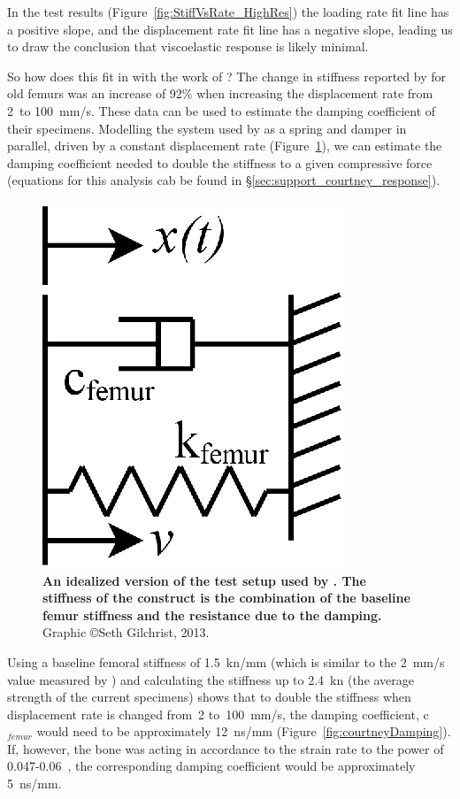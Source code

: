 In the test results (Figure~\ref{fig:StiffVsRate_HighRes}) the loading rate fit line has a positive slope, and the displacement rate fit line has a negative slope, leading us to draw the conclusion that viscoelastic response is likely minimal.

So how does this fit in with the work of \citet{courtney_effects_1994}?
The change in stiffness reported by \citet{courtney_effects_1994} for old femurs was an increase of 92\% when increasing the displacement rate from 2~to 100~\ac{mm}/\ac{s}.
These data can be used to estimate the damping coefficient of their specimens.
Modelling the system used by \citet{courtney_effects_1994} as a spring and damper in parallel, driven by a constant displacement rate (Figure~\ref{fig:courtneyModel}), we can estimate the damping coefficient needed to double the stiffness to a given compressive force (equations for this analysis cab be found in \S\ref{sec:support_courtney_response}).

\begin{figure}
\centering
\includegraphics[width=0.3\linewidth]{./behave_fail/Figures/courtneyModel}
\caption[Idealized \citet{courtney_effects_1994} model]{\textbf{An idealized version of the test setup used by \citet{courtney_effects_1994}. The stiffness of the construct is the combination of the baseline femur stiffness and the resistance due to the damping.} Graphic \copyright Seth Gilchrist, 2013.}
\label{fig:courtneyModel}
\end{figure}

Using a baseline femoral stiffness of 1.5~\ac{kn}/\ac{mm} (which is similar to the 2~\ac{mm}/\ac{s} value measured by \citet{courtney_effects_1994}) and calculating the stiffness up to 2.4~\ac{kn} (the average strength of the current specimens) shows that to double the stiffness when displacement rate is changed from~2 to~100~\ac{mm}/\ac{s}, the damping coefficient, c$_{femur}$ would need to be approximately 12~\ac{n}\ac{s}/\ac{mm} (Figure~\ref{fig:courtneyDamping}).
If, however, the bone was acting in accordance to the strain rate to the power of 0.047-0.06~\citep{carter_compressive_1977, linde_mechanical_1991, crowninshield_response_1974}, the corresponding damping coefficient would be approximately 5~\ac{n}\ac{s}/\ac{mm}.

